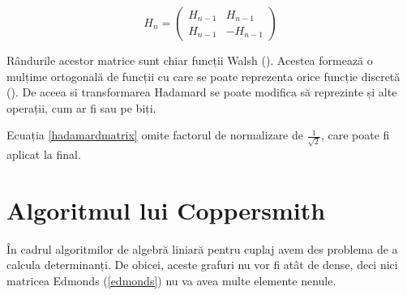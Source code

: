 \begin{equation}
  \label{hadamardmatrix}
  H_{n} =
  \begin{pmatrix}
    H_{n-1} & H_{n-1}\\
    H_{n-1} & -H_{n-1}
  \end{pmatrix}
\end{equation}

Rândurile acestor matrice sunt chiar funcții Walsh (\cite{fwht}). Acestea formează
o mulțime ortogonală de funcții cu care se poate reprezenta orice funcție discretă (\cite{hadamard}).
De aceea si transformarea Hadamard se poate modifica să reprezinte și alte operații,
cum ar fi sau pe biți.

\pagebreak

Ecuația \ref{hadamardmatrix} omite factorul de normalizare de
$\frac{1}{\sqrt{2}}$, care poate fi aplicat la final.

\begin{algorithm}[H]
  \DontPrintSemicolon
  \;
\end{algorithm}

\begin{algorithm}[H]
  \DontPrintSemicolon
  \;
\end{algorithm}

\pagebreak

\section{Algoritmul lui Coppersmith}
\label{coppersmith}

În cadrul algoritmilor de algebră liniară pentru cuplaj avem des problema de a
calcula determinanți. De obicei, aceste grafuri nu vor fi atât de dense, deci
nici matricea Edmonds (\ref{edmonds}) nu va avea multe elemente nenule.

